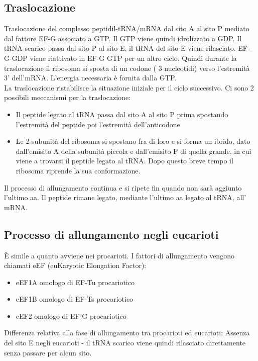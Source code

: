 \documentclass{article}
\begin{document}
\subsection{Traslocazione}
Traslocazione del complesso peptidil-tRNA/mRNA dal sito A al sito P mediato dal fattore EF-G associato a GTP. Il GTP viene quindi idrolizzato a GDP. Il tRNA
scarico passa dal sito P al sito E, il tRNA del sito E viene rilasciato. EF-G-GDP viene riattivato in EF-G GTP per un altro ciclo. Quindi durante la traslocazione il ribosoma si sposta
di un codone ( 3 nucleotidi) verso l'estremità 3' dell'mRNA. L'energia necessaria è fornita dalla GTP.\\
La traslocazione ristabilisce la situazione iniziale per il ciclo successivo. Ci sono 2 possibili meccanismi per la traslocazione:
\begin{itemize}
    \item Il peptide legato al tRNA passa dal sito A al
    sito P prima spostando l'estremità del
    peptide poi l'estremità dell'anticodone
    \item Le 2 subunità del ribosoma si spostano fra di loro e si forma un ibrido, dato
    dall'emisito A della subunità piccola e dall'emisito P di quella
    grande, in cui viene a trovarsi il peptide legato al
    tRNA. Dopo questo breve tempo il ribosoma riprende la sua conformazione.
\end{itemize}
Il processo di allungamento continua e si ripete fin quando non sarà aggiunto l'ultimo aa.
Il peptide rimane legato, mediante l'ultimo aa legato al tRNA, all' mRNA.
\subsection{Processo di allungamento negli eucarioti}
È simile a quanto avviene nei procarioti. I fattori di allungamento vengono chiamati eEF (euKaryotic Elongation Factor):
\begin{itemize}
    \item eEF1A omologo di EF-Tu procariotico
    \item eEF1B omologo di EF-Ts procariotico
    \item eEF2 omologo di EF-G procariotico
\end{itemize}
Differenza relativa alla fase di allungamento tra procarioti ed eucarioti: Assenza del sito E negli eucarioti - il tRNA scarico viene quindi rilasciato
direttamente senza passare per alcun sito.
\end{document}
